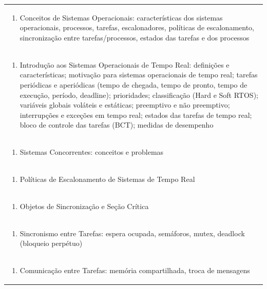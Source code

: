 \documentclass[11pt]{article}
\begin{document}
\begin{center}
\begin{longtable}{|p{4cm}|p{4cm}|p{4cm}|p{4cm}|}
\multicolumn{4}{|p{\dimexpr 16cm + 6\tabcolsep\relax}|}{\begin{enumerate}[start=1]\item Conceitos de Sistemas Operacionais: características dos sistemas operacionais, processos, tarefas, escalonadores, políticas de escalonamento, sincronização entre tarefas/processos, estados das tarefas e dos processos\end{enumerate}}\\
\multicolumn{4}{|p{\dimexpr 16cm + 6\tabcolsep\relax}|}{\begin{enumerate}[start=2]\item Introdução aos Sistemas Operacionais de Tempo Real: definições e características; motivação para sistemas operacionais de tempo real; tarefas periódicas e aperiódicas (tempo de chegada, tempo de pronto, tempo de execução, período, deadline); prioridades; classificação (Hard e Soft RTOS); variáveis globais voláteis e estáticas; preemptivo e não preemptivo; interrupções e exceções em tempo real; estados das tarefas de tempo real; bloco de controle das tarefas (BCT); medidas de desempenho\end{enumerate}}\\
\multicolumn{4}{|p{\dimexpr 16cm + 6\tabcolsep\relax}|}{\begin{enumerate}[start=3]\item Sistemas Concorrentes: conceitos e problemas\end{enumerate}}\\
\multicolumn{4}{|p{\dimexpr 16cm + 6\tabcolsep\relax}|}{\begin{enumerate}[start=4]\item Políticas de Escalonamento de Sistemas de Tempo Real\end{enumerate}}\\
\multicolumn{4}{|p{\dimexpr 16cm + 6\tabcolsep\relax}|}{\begin{enumerate}[start=5]\item Objetos de Sincronização e Seção Crítica\end{enumerate}}\\
\multicolumn{4}{|p{\dimexpr 16cm + 6\tabcolsep\relax}|}{\begin{enumerate}[start=6]\item Sincronismo entre Tarefas: espera ocupada, semáforos, mutex, deadlock (bloqueio perpétuo)\end{enumerate}}\\
\multicolumn{4}{|p{\dimexpr 16cm + 6\tabcolsep\relax}|}{\begin{enumerate}[start=7]\item Comunicação entre Tarefas: memória compartilhada, troca de mensagens\end{enumerate}}\\

\end{longtable}
\end{center}
\end{document}
